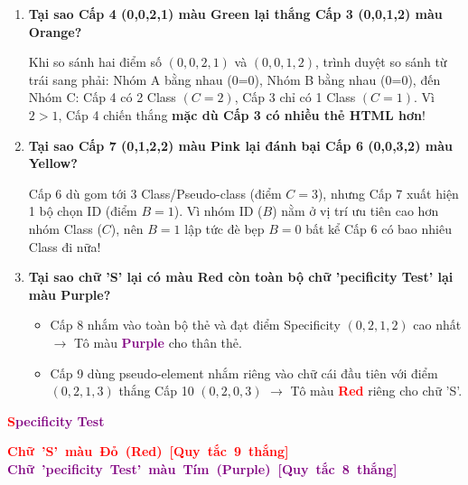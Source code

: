 \begin{conceptBox}
\begin{enumerate}[leftmargin=1.5em, itemsep=4pt, parsep=0pt]
    \item \textbf{Tại sao Cấp 4 (0,0,2,1) màu Green lại thắng Cấp 3 (0,0,1,2) màu Orange?} \par
    Khi so sánh hai điểm số $(0,0,2,1)$ và $(0,0,1,2)$, trình duyệt so sánh từ trái sang phải: Nhóm A bằng nhau (0=0), Nhóm B bằng nhau (0=0), đến Nhóm C: Cấp 4 có 2 Class $(C=2)$, Cấp 3 chỉ có 1 Class $(C=1)$. Vì $2 > 1$, Cấp 4 chiến thắng \textbf{mặc dù Cấp 3 có nhiều thẻ HTML hơn}!
    
    \item \textbf{Tại sao Cấp 7 (0,1,2,2) màu Pink lại đánh bại Cấp 6 (0,0,3,2) màu Yellow?} \par
    Cấp 6 dù gom tới 3 Class/Pseudo-class (điểm $C=3$), nhưng Cấp 7 xuất hiện 1 bộ chọn ID  (điểm $B=1$). Vì nhóm ID ($B$) nằm ở vị trí ưu tiên cao hơn nhóm Class ($C$), nên $B=1$ lập tức đè bẹp $B=0$ bất kể Cấp 6 có bao nhiêu Class đi nữa!
    
    \item \textbf{Tại sao chữ 'S' lại có màu Red còn toàn bộ chữ 'pecificity Test' lại màu Purple?} \par
    \begin{itemize}[leftmargin=1.2em, itemsep=2pt]
        \item Cấp 8 nhắm vào toàn bộ thẻ  và đạt điểm Specificity $(0,2,1,2)$ cao nhất $\rightarrow$ Tô màu \textbf{\textcolor{purple}{Purple}} cho thân thẻ.
        \item Cấp 9 dùng pseudo-element  nhắm riêng vào chữ cái đầu tiên  với điểm $(0,2,1,3)$ thắng Cấp 10 $(0,2,0,3)$ $\rightarrow$ Tô màu \textbf{\textcolor{red}{Red}} riêng cho chữ 'S'.
    \end{itemize}
\end{enumerate}
\end{conceptBox}

\begin{browserWindow}
\centering\vspace{8pt}
{\sffamily\Huge\bfseries \textcolor{red}{S}\textcolor{purple}{pecificity Test}}
\par\vspace{10pt}
\sffamily\small
\mbox{\textcolor{red}{\textbf{Chữ 'S' màu Đỏ (Red) [Quy tắc 9 thắng]}}} \qquad \mbox{\textcolor{purple}{\textbf{Chữ 'pecificity Test' màu Tím (Purple) [Quy tắc 8 thắng]}}}
\par\vspace{6pt}
\end{browserWindow}

